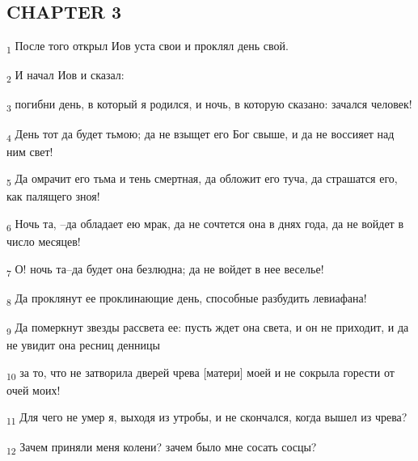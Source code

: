 \subsection{CHAPTER 3}
\begin{tcolorbox}
\textsubscript{1} После того открыл Иов уста свои и проклял день свой.
\end{tcolorbox}
\begin{tcolorbox}
\textsubscript{2} И начал Иов и сказал:
\end{tcolorbox}
\begin{tcolorbox}
\textsubscript{3} погибни день, в который я родился, и ночь, в которую сказано: зачался человек!
\end{tcolorbox}
\begin{tcolorbox}
\textsubscript{4} День тот да будет тьмою; да не взыщет его Бог свыше, и да не воссияет над ним свет!
\end{tcolorbox}
\begin{tcolorbox}
\textsubscript{5} Да омрачит его тьма и тень смертная, да обложит его туча, да страшатся его, как палящего зноя!
\end{tcolorbox}
\begin{tcolorbox}
\textsubscript{6} Ночь та, --да обладает ею мрак, да не сочтется она в днях года, да не войдет в число месяцев!
\end{tcolorbox}
\begin{tcolorbox}
\textsubscript{7} О! ночь та--да будет она безлюдна; да не войдет в нее веселье!
\end{tcolorbox}
\begin{tcolorbox}
\textsubscript{8} Да проклянут ее проклинающие день, способные разбудить левиафана!
\end{tcolorbox}
\begin{tcolorbox}
\textsubscript{9} Да померкнут звезды рассвета ее: пусть ждет она света, и он не приходит, и да не увидит она ресниц денницы
\end{tcolorbox}
\begin{tcolorbox}
\textsubscript{10} за то, что не затворила дверей чрева [матери] моей и не сокрыла горести от очей моих!
\end{tcolorbox}
\begin{tcolorbox}
\textsubscript{11} Для чего не умер я, выходя из утробы, и не скончался, когда вышел из чрева?
\end{tcolorbox}
\begin{tcolorbox}
\textsubscript{12} Зачем приняли меня колени? зачем было мне сосать сосцы?
\end{tcolorbox}
